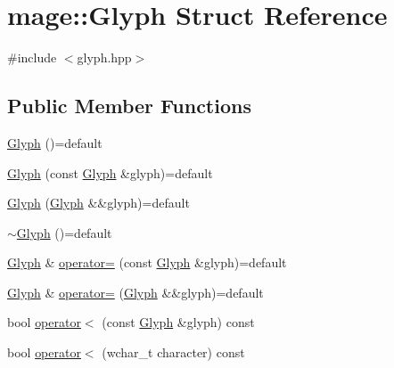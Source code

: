 \hypertarget{structmage_1_1_glyph}{}\section{mage\+:\+:Glyph Struct Reference}
\label{structmage_1_1_glyph}


{\ttfamily \#include $<$glyph.\+hpp$>$}

\subsection*{Public Member Functions}
\begin{DoxyCompactItemize}
\item 
\hyperlink{structmage_1_1_glyph_a86e6c795e2aaad853f54270c709969a6}{Glyph} ()=default
\item 
\hyperlink{structmage_1_1_glyph_a0ab4ca5253ac80f8849c7d56c0301d61}{Glyph} (const \hyperlink{structmage_1_1_glyph}{Glyph} \&glyph)=default
\item 
\hyperlink{structmage_1_1_glyph_a4b7ae94678d53ff2978635321e8f1144}{Glyph} (\hyperlink{structmage_1_1_glyph}{Glyph} \&\&glyph)=default
\item 
\hyperlink{structmage_1_1_glyph_aa8e903334e77cc2930149923461d06ab}{$\sim$\+Glyph} ()=default
\item 
\hyperlink{structmage_1_1_glyph}{Glyph} \& \hyperlink{structmage_1_1_glyph_ae9ea2dff58ce0765d7746af93d97c338}{operator=} (const \hyperlink{structmage_1_1_glyph}{Glyph} \&glyph)=default
\item 
\hyperlink{structmage_1_1_glyph}{Glyph} \& \hyperlink{structmage_1_1_glyph_a28a3279f2e142e4b771295d64d7cb414}{operator=} (\hyperlink{structmage_1_1_glyph}{Glyph} \&\&glyph)=default
\item 
bool \hyperlink{structmage_1_1_glyph_a27bcc5e1d96f6891a026e9e7a76251bb}{operator$<$} (const \hyperlink{structmage_1_1_glyph}{Glyph} \&glyph) const
\item 
bool \hyperlink{structmage_1_1_glyph_a28173087e7daf0b7710cf27f36f7e7e0}{operator$<$} (wchar\+\_\+t character) const
\end{DoxyCompactItemize}
